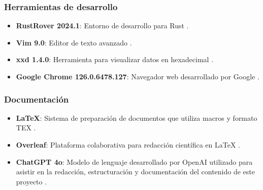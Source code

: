 \subsubsection*{Herramientas de desarrollo}
\begin{itemize}
\item \textbf{RustRover 2024.1}: Entorno de desarrollo para Rust \cite{rust_rover}.
\item \textbf{Vim 9.0}: Editor de texto avanzado \cite{vim}.
\item \textbf{xxd 1.4.0}: Herramienta para visualizar datos en hexadecimal \cite{xxd}.
\item \textbf{Google Chrome 126.0.6478.127}: Navegador web desarrollado por Google \cite{chrome}.
\end{itemize}

\subsubsection*{Documentación}
\begin{itemize}
\item \textbf{\LaTeX}: Sistema de preparación de documentos que utiliza macros y formato TEX \cite{latex_project}.
\item \textbf{Overleaf}: Plataforma colaborativa para redacción científica en LaTeX \cite{overleaf}.
\item \textbf{ChatGPT 4o}: Modelo de lenguaje desarrollado por OpenAI utilizado para asistir en la redacción, estructuración y documentación del contenido de este proyecto \cite{chatgpt}.
\end{itemize}

